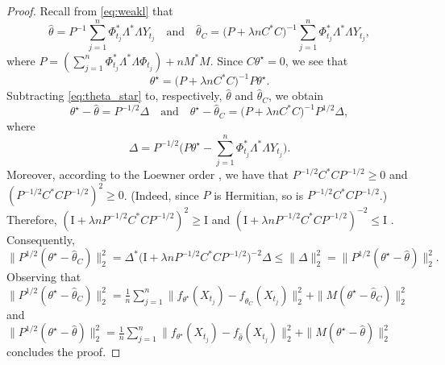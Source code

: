 \begin{proof} Recall from \eqref{eq:weakl} that
\[
    \hat \theta = P^{-1} \sum_{j=1}^n \mathbb \Phi_{t_j}^\ast \Lambda^\ast \Lambda Y_{t_j} \quad \mbox{and} \quad 
     \hat \theta_C = \big(P+ \lambda n C^\ast C\big)^{-1} \sum_{j=1}^n \mathbb \Phi_{t_j}^\ast \Lambda^\ast \Lambda Y_{t_j},
\]
where $P = ( \sum_{j=1}^n \mathbb \Phi_{t_j}^\ast \Lambda^\ast \Lambda\mathbb \Phi_{t_j}) + n M^\ast M$.
Since $C\theta^\star = 0$, we see that 
\begin{equation}
    \theta^\star = \big(P+ \lambda n C^\ast C\big)^{-1}P\theta^\star
    \label{eq:theta_star}.
\end{equation}
Subtracting \eqref{eq:theta_star} to, respectively, $\hat \theta$ and $\hat \theta_C$, we obtain
\[
     \theta^\star- \hat \theta = P^{-1/2} \Delta \quad \mbox{and}\quad 
    \theta^\star - \hat \theta_C = \big( P +\lambda n C^\ast C\big)^{-1} P^{1/2} \Delta,
\]
where \[\Delta = P^{-1/2}\Big(P\theta^\star- \sum_{j=1}^n \mathbb \Phi_{t_j}^\ast \Lambda^\ast \Lambda Y_{t_j}\Big).\] 
Moreover, according to the Loewner order \citep[see, e.g.,][Chapter~7.7]{Horn2012matrix}, we have that
$P^{-1/2}C^\ast C P^{-1/2} \geq 0$ and $(P^{-1/2}C^\ast C P^{-1/2})^2 \geq 0$. 
(Indeed, since $P$ is Hermitian, so is $P^{-1/2}C^\ast C P^{-1/2}$.)
Therefore, $(\mathrm{I} +\lambda n  P^{-1/2}C^\ast C P^{-1/2})^2 \geq \mathrm{I}$ and $( \mathrm{I} +\lambda n  P^{-1/2}C^\ast C P^{-1/2})^{-2} \leq \mathrm{I}$ \citep[see, e.g.,][Corollary~7.7.4]{Horn2012matrix}.
Consequently,
\[\|P^{1/2}(\theta^\star - \hat \theta_C)\|_2^2 = \Delta^\ast \big( \mathrm{I} +\lambda n  P^{-1/2}C^\ast C P^{-1/2}\big)^{-2} \Delta \leq \|\Delta\|_2^2 = \|P^{1/2}(\theta^\star - \hat \theta)\|_2^2.\]
Observing that $\|P^{1/2}(  \theta^\star-\hat \theta_C)\|_2^2 = \frac{1}{n}\sum_{j=1}^n\| f_{\theta^\star}(X_{t_j}) - f_{\hat \theta_C}(X_{t_j})\|_2^2 + \|M(\theta^\star- \hat \theta_C)\|_2^2$ and $\|P^{1/2}( \theta^\star- \hat \theta)\|_2^2 = \frac{1}{n}\sum_{j=1}^n\| f_{\theta^\star}(X_{t_j}) - f_{\hat \theta}(X_{t_j})\|_2^2 + \|M(\theta^\star- \hat \theta)\|_2^2$ concludes the proof.
\end{proof}

